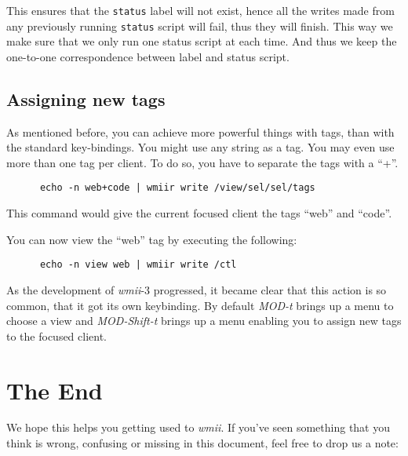 \documentclass[12pt,a4paper]{article} %
\newcommand{\wmii}{\emph{wmii}}
\begin{document}
    This ensures that the \verb+status+ label will not exist, hence all
    the writes made from any previously running \verb+status+ script
    will fail, thus they will finish. This way we make sure that
    we only run one status script at each time.  And thus we keep the
    one-to-one correspondence between label and status script.
    
    \subsection{Assigning new tags}
    
    As mentioned before, you can achieve more powerful things with tags, than
    with the standard key-bindings. You might use any string as a tag. You may
    even use more than one tag per client. To do so, you have to separate the
    tags with a ``+''.

    \begin{verbatim}
      echo -n web+code | wmiir write /view/sel/sel/tags
    \end{verbatim}

    This command would give the current focused client the tags
    ``web'' and ``code''.
    
    You can now view the ``web'' tag by executing the following:

    \begin{verbatim}
      echo -n view web | wmiir write /ctl
    \end{verbatim}

    As the development of \wmii-3 progressed, it became clear that this
    action is so common, that it got its own keybinding. By default
    \emph{MOD-t} brings up a menu to choose a view and
    \emph{MOD-Shift-t} brings up a menu enabling you to assign new
    tags to the focused client.


    \section{The End}
    \label{sec:end}
    
    We hope this helps you getting used to \wmii.
    If you've seen something that you think is wrong, confusing or missing in
    this document, feel free to drop us a note:
\end{document}

